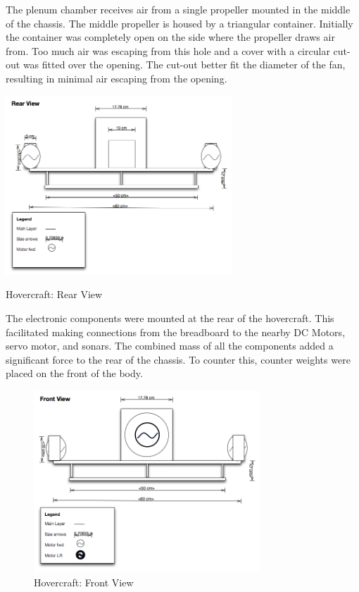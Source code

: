 The plenum chamber receives air from a single propeller mounted in the middle of the chassis. The middle propeller is housed by a triangular container. Initially the container was completely open on the side where the propeller draws air from. Too much air was escaping from this hole and a cover with a circular cut-out was fitted over the opening. The cut-out better fit the diameter of the fan, resulting in minimal air escaping from the opening.


  \begin{center}
    \includegraphics[width=85mm]{imageSources/rearView.png}
  \end{center}
  \caption{Hovercraft: Rear View} 
  \label{rearView}


The electronic components were mounted at the rear of the hovercraft. This facilitated making connections from the breadboard to the nearby DC Motors, servo motor, and sonars. The combined mass of all the components added a significant force to the rear of the chassis. To counter this, counter weights were placed on the front of the body.

\begin{figure}[h]
  \begin{center}
    \includegraphics[width=85mm]{imageSources/frontView.png}
  \end{center}
  \caption{Hovercraft: Front View} 
  \label{frontView}
\end{figure}

